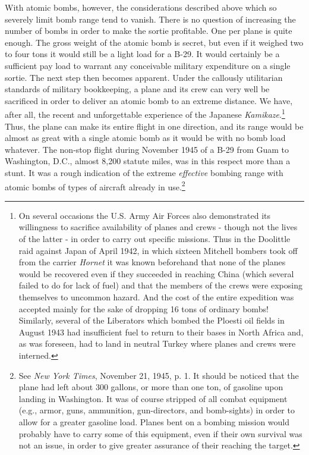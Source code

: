 With atomic bombs, however, the considerations described above which so severely limit bomb range tend to vanish. There is no question of increasing the number of bombs in order to make the sortie profitable. One per plane is quite enough. The gross weight of the atomic bomb is secret, but even if it weighed two to four tons it would still be a light load for a B-29. It would certainly be a sufficient pay load to warrant any conceivable military expenditure on a single sortie. The next step then becomes apparent. Under the callously utilitarian standards of military bookkeeping, a plane and its crew can very well be sacrificed in order to deliver an atomic bomb to an extreme distance. We have, after all, the recent and unforgettable experience of the Japanese \textit{Kamikaze}.\footnote{On several occasions the U.S. Army Air Forces also demonstrated its willingness to sacrifice availability of planes and crews - though not the lives of the latter - in order to carry out specific missions. Thus in the Doolittle raid against Japan of April 1942, in which sixteen Mitchell bombers took off from the carrier \textit{Hornet} it was known beforehand that none of the planes would be recovered even if they succeeded in reaching China (which several failed to do for lack of fuel) and that the members of the crews were exposing themselves to uncommon hazard. And the cost of the entire expedition was accepted mainly for the sake of dropping 16 tons of ordinary bombs! Similarly, several of the Liberators which bombed the Ploesti oil fields in August 1943 had insufficient fuel to return to their bases in North Africa and, as was foreseen, had to land in neutral Turkey where planes and crews were interned.} Thus, the plane can make its entire flight in one direction, and its range would be almost as great with a single atomic bomb as it would be with no bomb load whatever. The non-stop flight during November 1945 of a B-29 from Guam to Washington, D.C., almost 8,200 statute miles, was in this respect more than a stunt. It was a rough indication of the extreme \emph{effective} bombing range with atomic bombs of types of aircraft already in use.\footnote{See \textit{New York Times}, November 21, 1945, p. 1. It should be noticed that the plane had left about 300 gallons, or more than one ton, of gasoline upon landing in Washington. It was of course stripped of all combat equipment (e.g., armor, guns, ammunition, gun-directors, and bomb-sights) in order to allow for a greater gasoline load. Planes bent on a bombing mission would probably have to carry some of this equipment, even if their own survival was not an issue, in order to give greater assurance of their reaching the target.}


